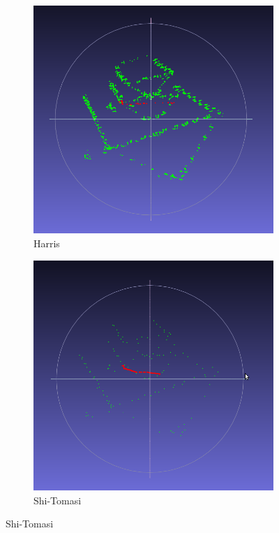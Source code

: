\begin{figure}[H]
	\centering
	\begin{subfigure}{0.5\textwidth}
	  \centering
	  \includegraphics[width=0.9\linewidth]{figs/SFM1.png}
	  \caption{Harris}
	\end{subfigure}%
	\begin{subfigure}{0.5\textwidth}
	  \centering
	  \includegraphics[width=0.9\linewidth]{figs/SFM1-Shitomosi.png}
	  \caption{Shi-Tomasi}
	\end{subfigure}

\end{figure}
